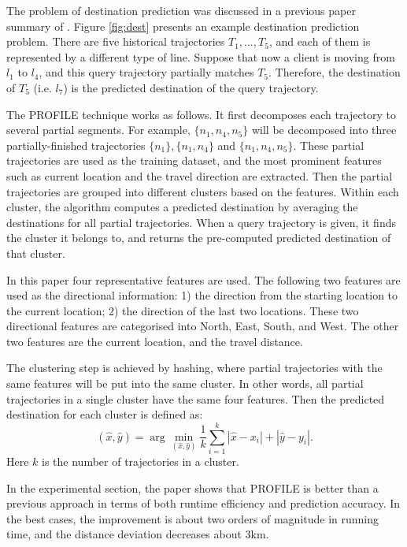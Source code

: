 \documentclass[paper=a4, fontsize=18pt]{article} %
\numberwithin{equation}{section} %
\numberwithin{figure}{section} %
\numberwithin{table}{section} %
\begin{document}
The problem of destination prediction was discussed in a previous paper summary of \cite{XZZXHX13}.
Figure \ref{fig:dest} presents an example destination prediction problem. There are five historical trajectories $T_1, ..., T_5$, and each of them is represented by a different type of line. Suppose that now a client is moving from $l_1$ to $l_4$, and this query trajectory partially matches $T_5$. Therefore, the destination of $T_5$ (i.e. $l_7$) is the predicted destination of the query trajectory.

The PROFILE technique works as follows. It first decomposes each trajectory to several partial segments. For example, $\{n_1, n_4, n_5\}$ will be decomposed into three partially-finished trajectories $\{n_1\}, \{n_1, n_4\}$ and $\{n_1, n_4, n_5\}$. These partial trajectories are used as the training dataset, and the most prominent features such as current location and the travel direction are extracted. Then the partial trajectories are grouped into different clusters based on the features. Within each cluster, the algorithm computes a predicted destination by averaging the destinations for all partial trajectories. When a query trajectory is given, it finds the cluster it belongs to, and returns the pre-computed predicted destination of that cluster.

In this paper four representative features are used. The following two features are used as the directional information: 1) the direction from the starting location to the current location; 2) the direction of the last two locations. These two directional features are categorised into North, East, South, and West. The other two features are the current location, and the travel distance.

The clustering step is achieved by hashing, where partial trajectories with the same features will be put into the same cluster. In other words, all partial trajectories in a single cluster have the same four features.
Then the predicted destination for each cluster is defined as:
$$(\hat{x}, \hat{y}) = \arg \min_{(\hat{x}, \hat{y})} \frac{1}{k} \sum_{i=1}^k | \hat{x} - x_i | + | \hat{y} - y_i|.$$
Here $k$ is the number of trajectories in a cluster.

In the experimental section, the paper shows that PROFILE is better than a previous approach in terms of both runtime efficiency and prediction accuracy. In the best cases, the improvement is about two orders of magnitude in running time, and the distance deviation decreases about 3km.
\end{document}
